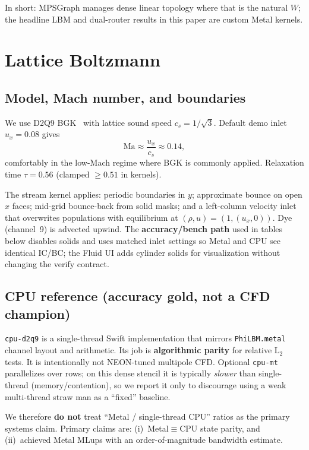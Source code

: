 \documentclass[11pt,a4paper]{article}
\begin{document}
In short: MPSGraph manages dense linear topology where that is the natural
$W$; the headline LBM and dual-router results in this paper are custom Metal
kernels.

\section{Lattice Boltzmann}
\label{sec:lbm}

\subsection{Model, Mach number, and boundaries}
We use D2Q9 BGK~\cite{succi2001,kruger2017} with lattice sound speed
$c_s=1/\sqrt{3}$. Default demo inlet $u_x=0.08$ gives
\begin{equation}
  \mathrm{Ma} \approx \frac{u_x}{c_s} \approx 0.14,
\end{equation}
comfortably in the low-Mach regime where BGK is commonly applied. Relaxation
time $\tau=0.56$ (clamped $\ge0.51$ in kernels).

The stream kernel applies: periodic boundaries in $y$; approximate bounce on
open $x$ faces; mid-grid bounce-back from solid masks; and a left-column
velocity inlet that overwrites populations with equilibrium at
$(\rho,u)=(1,(u_x,0))$. Dye (channel~9) is advected upwind. The
\textbf{accuracy/bench path} used in tables below disables solids and uses
matched inlet settings so Metal and CPU see identical IC/BC; the Fluid UI
adds cylinder solids for visualization without changing the verify
contract.

\subsection{CPU reference (accuracy gold, not a CFD champion)}
\texttt{cpu-d2q9} is a single-thread Swift implementation that mirrors
\texttt{PhiLBM.metal} channel layout and arithmetic. Its job is
\textbf{algorithmic parity} for relative $\mathrm{L}_2$ tests. It is
intentionally not NEON-tuned multipole CFD. Optional \texttt{cpu-mt}
parallelizes over rows; on this dense stencil it is typically
\emph{slower} than single-thread (memory/contention), so we report it only
to discourage using a weak multi-thread straw man as a ``fixed'' baseline.

We therefore \textbf{do not} treat ``Metal / single-thread CPU'' ratios as
the primary systems claim. Primary claims are: (i)~Metal$\equiv$CPU state
parity, and (ii)~achieved Metal MLups with an order-of-magnitude bandwidth
estimate.
\end{document}
